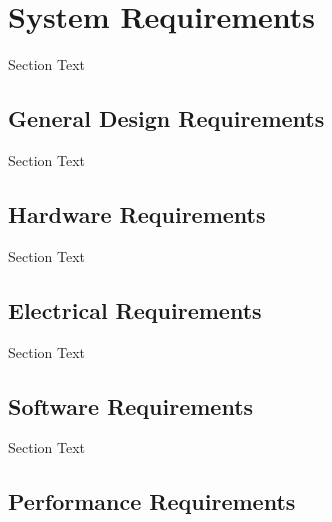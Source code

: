 %

\setcounter{section}{2}
\section{System Requirements}
Section Text


\break
\subsection{General Design Requirements}
Section Text


\break
\subsection{Hardware Requirements}
Section Text


\break
\subsection{Electrical Requirements}
Section Text


\break
\subsection{Software Requirements}
Section Text


\break
\subsection{Performance Requirements}



%




